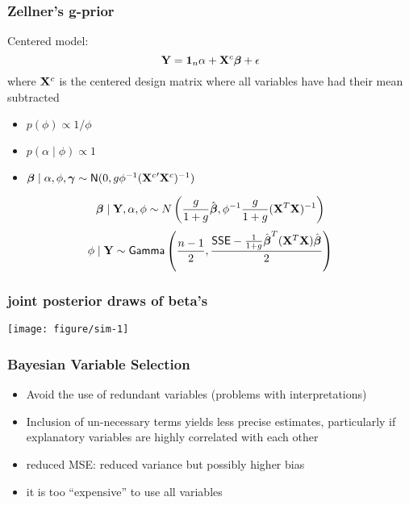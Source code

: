 \documentclass{beamer}\usepackage[]{graphicx}\usepackage[]{color}
\makeatletter
\def\maxwidth{ %
  \ifdim\Gin@nat@width>\linewidth
    \linewidth
  \else
    \Gin@nat@width
  \fi
}
\newenvironment{knitrout}{}{} %
\makeatother
\begin{document}
\begin{frame}\frametitle{Zellner's g-prior}
  Centered model:  $$\mathbf{Y} = \mathbf{1}_n \alpha + \mathbf{X}^c \boldsymbol{\beta} + \epsilon$$
  where $\mathbf{X}^c$ is the centered design matrix where all variables have
  had their mean subtracted \pause
\begin{itemize}
\item  $p(\phi) \propto 1/\phi$  \pause
\item   $p(\alpha \mid \phi) \propto 1$ \pause
\item  $\boldsymbol{\beta} \mid \alpha, \phi, \boldsymbol{\gamma} \sim \textsf{N}(0, g \phi^{-1}
  ({\mathbf{X}^c}^\prime \mathbf{X}^c)^{-1})$ \pause
\end{itemize}

$$\boldsymbol{\beta} \mid \mathbf{Y}, \alpha, \phi \sim N\left(\frac{g}{1 + g} \hat{\boldsymbol{\beta}}, \phi^{-1}\frac{g}{1 + g} (\mathbf{X}^T\mathbf{X})^{-1} \right)$$
$$ \phi \mid \mathbf{Y} \sim \textsf{Gamma} \left(\frac{n-1}{2}, \frac{\textsf{SSE} - \frac{1}{1 + g} \hat{\boldsymbol{\beta}}^T (\mathbf{X}^T\mathbf{X}) \hat{\boldsymbol{\beta}}}{2} \right) $$
\end{frame}

\begin{frame} \frametitle{joint posterior draws of beta's}
\begin{knitrout}
\color{fgcolor}

{\centering \texttt{[image: figure/sim-1]} 

}



\end{knitrout}

\end{frame}


\begin{frame} \frametitle{Bayesian Variable Selection}
  \begin{itemize}
   \item Avoid the use of redundant variables (problems with
    interpretations) \pause
   \item Inclusion of un-necessary terms yields less precise
  estimates, particularly if explanatory variables are highly
  correlated with each other \pause
  \item reduced MSE: reduced variance but possibly higher bias  \pause
  \item it is too ``expensive'' to use all variables
  \end{itemize}
\end{frame}
\end{document}

